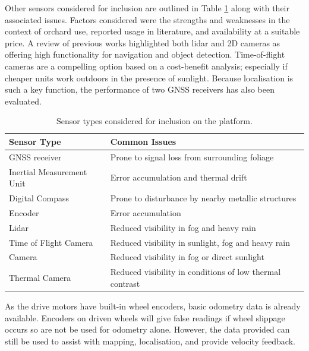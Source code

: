 \documentclass[preprint,authoryear,12pt]{elsarticle}
\begin{document}
    Other sensors considered for inclusion are outlined in Table \ref{table:sensor_comparison} along with their associated issues.
    Factors considered were the strengths and weaknesses in the context of orchard use, reported usage in literature, and availability at a suitable price.
    A review of previous works highlighted both lidar and 2D cameras as offering high functionality for navigation and object detection.
    Time-of-flight cameras are a compelling option based on a cost-benefit analysis; especially if cheaper units work outdoors in the presence of sunlight.
    Because localisation is such a key function, the performance of two GNSS receivers has also been evaluated.

    \begin{table}[htbp]
        \centering
        \footnotesize
        \begin{tabular}{ l l}

            \textbf{Sensor Type}      &\textbf{Common Issues} \\ \hline
            GNSS receiver              & Prone to signal loss from surrounding foliage\\  \hline
            Inertial Measurement Unit & Error accumulation and thermal drift\\ \hline
            Digital Compass           & Prone to disturbance by nearby metallic structures\\ \hline
            Encoder                   & Error accumulation \\ \hline
            Lidar                     & Reduced visibility in fog and heavy rain \\ \hline
            Time of Flight Camera     & Reduced visibility in sunlight, fog and heavy rain \\ \hline
            Camera                    & Reduced visibility in fog or direct sunlight \\ \hline
            Thermal Camera            & Reduced visibility in conditions of low thermal contrast\\ \hline
        \end{tabular}
        \caption{Sensor types considered for inclusion on the platform.}
        \label{table:sensor_comparison}
    \end{table}

    As the drive motors have built-in wheel encoders, basic odometry data is already available.
    Encoders on driven wheels will give false readings if wheel slippage occurs so are not be used for odometry alone.
    However, the data provided can still be used to assist with mapping, localisation, and provide velocity feedback.
\end{document}
